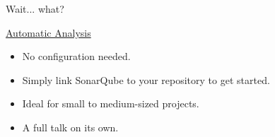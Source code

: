 \documentclass[aspectratio=169]{beamer}
\begin{document}
\begin{frame}{Wait... what?}
  \begin{block}{\href{https://docs.sonarsource.com/sonarqube-cloud/advanced-setup/automatic-analysis/\#automatic-analysis-for-c-and-c-projects-}{Automatic Analysis}}
    \begin{itemize}
      \item No configuration needed.
      \item Simply link SonarQube to your repository to get started.
      \item Ideal for small to medium-sized projects.
      \item A full talk on its own.
    \end{itemize}
  \end{block}
\end{frame}
\end{document}

